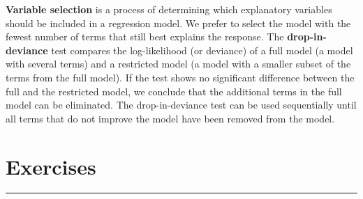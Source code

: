 \documentclass[
]{report}
\newcounter{excount}
\begin{document}
\textbf{Variable selection} is a process of determining which explanatory variables should be included in a regression model. We prefer to select the model with the fewest number of terms that still best explains the response. The \textbf{drop-in-deviance} test compares the log-likelihood (or deviance) of a full model (a model with several terms) and a restricted model (a model with a smaller subset of the terms from the full model). If the test shows no significant difference between the full and the restricted model, we conclude that the additional terms in the full model can be eliminated. The drop-in-deviance test can be used sequentially until all terms that do not improve the model have been removed from the model.

\hypertarget{exercises-5}{%
\section*{\texorpdfstring{\textbf{Exercises}}{Exercises}}\label{exercises-5}}

\vspace{-2em}

\noindent

\rule{\linewidth}{0.4pt}

\setcounter{excount}{0}
\end{document}
